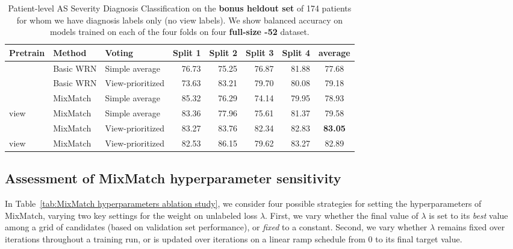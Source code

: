 \begin{table}[!h]
    \centering
    \begin{tabular}{l l l|rrrr|c}
    Pretrain & Method & Voting
    & Split 1  & Split 2 & Split 3 & Split 4 & average\\
    \hline
    & Basic WRN & Simple average & 76.73 & 75.25 & 76.87 & 81.88 & 77.68\\
    & Basic WRN & View-prioritized & 73.63 & 83.21 & 79.70 & 80.08 & 79.18\\
    \hline
    & MixMatch & Simple average & 85.32 & 76.29 & 74.14 & 79.95 & 78.93\\
    view & MixMatch & Simple average & 83.36 & 77.96 & 75.61 & 81.37 & 79.58\\
    & MixMatch & View-prioritized & 83.27 & 83.76 & 82.34 & 82.83 & \textbf{83.05}\\
    view & MixMatch & View-prioritized & 82.53 & 86.15 & 79.62 & 83.27 & 82.89\\
    \end{tabular}
    \caption{Patient-level AS Severity Diagnosis Classification on the \textbf{bonus heldout set} of 174 patients for whom we have diagnosis labels only (no view labels). We show balanced accuracy on models trained on each of the four folds on four \textbf{full-size -52} dataset.
    }%
    \label{tab:diagnosis classification patient unlabeled_heldout_174}
\end{table}


\subsection{Assessment of MixMatch hyperparameter sensitivity}

In Table~\ref{tab:MixMatch hyperparameters ablation study}, we consider four possible strategies for setting the hyperparameters of MixMatch, varying two  key settings for the weight on unlabeled loss $\lambda$. First, we vary whether the final value of $\lambda$ is set to its \emph{best} value among a grid of candidates (based on validation set performance), or \emph{fixed} to a constant.
Second, we vary whether $\lambda$ remains fixed over iterations throughout a training run, or is updated over iterations on a linear ramp schedule from 0 to its final target value. 

